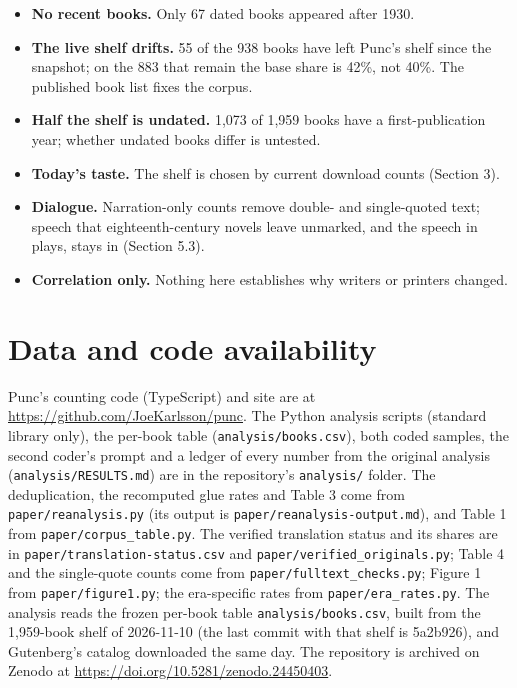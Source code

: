 \documentclass[
  11pt,
]{article}
\begin{document}
\begin{itemize}
  \textbf{Start period.} 1700--1749 is the peak of P for the whole shelf but not for prose alone, where the 10 books from 1600--1649 run longer.
\item
  \textbf{No recent books.} Only 67 dated books appeared after 1930.
\item
  \textbf{The live shelf drifts.} 55 of the 938 books have left Punc's shelf since the snapshot; on the 883 that remain the base share is 42\%, not 40\%. The published book list fixes the corpus.
\item
  \textbf{Half the shelf is undated.} 1,073 of 1,959 books have a first-publication year; whether undated books differ is untested.
\item
  \textbf{Today's taste.} The shelf is chosen by current download counts (Section 3).
\item
  \textbf{Dialogue.} Narration-only counts remove double- and single-quoted text; speech that eighteenth-century novels leave unmarked, and the speech in plays, stays in (Section 5.3).
\item
  \textbf{Correlation only.} Nothing here establishes why writers or printers changed.
\end{itemize}

\section{Data and code availability}\label{data-and-code-availability}

Punc's counting code (TypeScript) and site are at \url{https://github.com/JoeKarlsson/punc}. The Python analysis scripts (standard library only), the per-book table (\texttt{analysis/books.csv}), both
coded samples, the second coder's prompt and a ledger of every number from the original analysis (\texttt{analysis/RESULTS.md}) are in the repository's \texttt{analysis/} folder. The deduplication,
the recomputed glue rates and Table 3 come from \texttt{paper/reanalysis.py} (its output is \texttt{paper/reanalysis-output.md}), and Table 1 from \texttt{paper/corpus\_table.py}. The verified
translation status and its shares are in \texttt{paper/translation-status.csv} and \texttt{paper/verified\_originals.py}; Table 4 and the single-quote counts come from
\texttt{paper/fulltext\_checks.py}; Figure 1 from \texttt{paper/figure1.py}; the era-specific rates from \texttt{paper/era\_rates.py}. The analysis reads the frozen per-book table
\texttt{analysis/books.csv}, built from the 1,959-book shelf of 2026-11-10 (the last commit with that shelf is 5a2b926), and Gutenberg's catalog downloaded the same day. The repository is archived on
Zenodo at \url{https://doi.org/10.5281/zenodo.24450403}.
\end{document}
